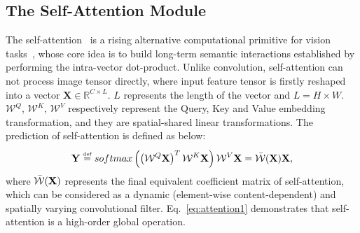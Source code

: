 \documentclass{article}
\begin{document}
\subsection{The Self-Attention Module}
The self-attention~\cite{DBLP:conf/nips/VaswaniSPUJGKP17} is a rising alternative computational primitive for vision tasks~\cite{DBLP:journals/corr/abs-2103-12731,DBLP:journals/corr/abs-2103-14030,DBLP:journals/corr/abs-2010-04159,DBLP:conf/eccv/CarionMSUKZ20}, whose core idea is to build long-term semantic interactions established by performing the intra-vector dot-product.
Unlike convolution, self-attention can not process image tensor directly, where input feature tensor is firstly reshaped into a vector {\small$\mathbf{X}\in \mathbb{R}^{C\times L}$}. $L$ represents the length of the vector and {\small$L = H\times W$}.
{\small$\mathcal{W}^Q$,
$\mathcal{W}^K$,
$\mathcal{W}^V$} respectively represent the Query, Key and Value embedding transformation,
and they are spatial-shared linear transformations.
The prediction of self-attention is defined as below:
\begin{equation}
\centering
\mathbf{Y} \overset{\underset{\mathrm{def}}{}}{=}
softmax\left(\left(\mathcal{W}^Q\mathbf{X}\right)^T\mathcal{W}^K\mathbf{X}\right)\mathcal{W}^V \mathbf{X}
= \Bar{\mathcal{W}}(\mathbf{X})\mathbf{X},
\label{eq:attention1}
\end{equation}
where {\small$\Bar{\mathcal{W}}(\mathbf{X})$} represents the final equivalent coefficient matrix of self-attention, which can be considered as a dynamic (element-wise content-dependent) and spatially varying convolutional filter.
Eq.~\ref{eq:attention1} demonstrates that self-attention is a high-order global operation.
\end{document}
